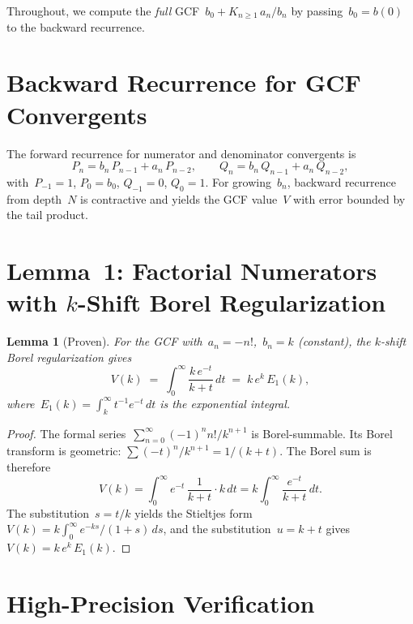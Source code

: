 \documentclass[11pt,a4paper]{article}
\newtheorem{lemma}[theorem]{Lemma}
\begin{document}
Throughout, we compute the \emph{full} GCF~$b_0 + K_{n\geq 1}\,a_n/b_n$ by passing~$b_0 = b(0)$ to the backward recurrence.

\section{Backward Recurrence for GCF Convergents}\label{sec:backward}

The forward recurrence for numerator and denominator convergents is
\[
  P_n = b_n\,P_{n-1} + a_n\,P_{n-2}, \qquad
  Q_n = b_n\,Q_{n-1} + a_n\,Q_{n-2},
\]
with~$P_{-1}=1$, $P_0=b_0$, $Q_{-1}=0$, $Q_0=1$. For growing~$b_n$, backward recurrence from depth~$N$ is contractive and yields the GCF value~$V$ with error bounded by the tail product.

\section{Lemma~1: Factorial Numerators with \texorpdfstring{$k$}{k}-Shift Borel Regularization}\label{sec:lemma1}

\begin{lemma}[Proven]\label{lem:borel}
For the GCF with~$a_n = -n!$,\ $b_n = k$ (constant), the $k$-shift Borel regularization gives
\begin{equation}\label{eq:V_k}
  V(k) \;=\; \int_0^\infty \frac{k\,e^{-t}}{k+t}\,dt \;=\; k\,e^k\,E_1(k),
\end{equation}
where~$E_1(k) = \int_k^\infty t^{-1} e^{-t}\,dt$ is the exponential integral.
\end{lemma}

\begin{proof}
The formal series~$\sum_{n=0}^\infty (-1)^n n!/k^{n+1}$ is Borel-summable. Its Borel transform is geometric: $\sum (-t)^n/k^{n+1} = 1/(k+t)$. The Borel sum is therefore
\[
  V(k) = \int_0^\infty e^{-t}\,\frac{1}{k+t}\cdot k\,dt = k\int_0^\infty \frac{e^{-t}}{k+t}\,dt.
\]
The substitution~$s = t/k$ yields the Stieltjes form~$V(k) = k\int_0^\infty e^{-ks}/(1+s)\,ds$, and the substitution~$u = k+t$ gives~$V(k) = k\,e^k\,E_1(k)$.
\end{proof}

\section{High-Precision Verification}\label{sec:verification}
\end{document}
